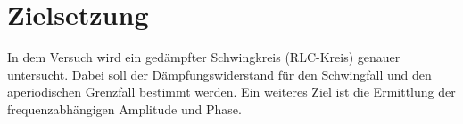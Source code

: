 \section{Zielsetzung}
\label{sec:Zielsetzung}
In dem Versuch wird ein gedämpfter Schwingkreis (RLC-Kreis) genauer untersucht.
Dabei soll der Dämpfungswiderstand für den Schwingfall und den aperiodischen Grenzfall bestimmt werden.
Ein weiteres Ziel ist die Ermittlung der frequenzabhängigen Amplitude und Phase.
